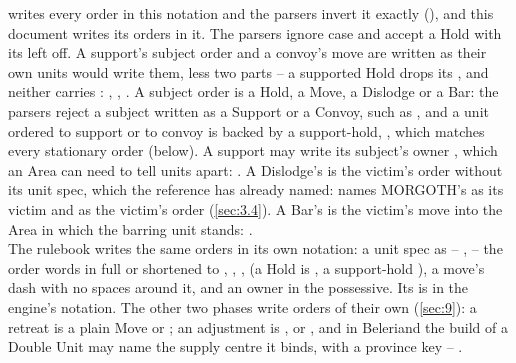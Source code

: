 \documentclass[12pt,a4paper]{article}
\begin{document}
 writes every order in this notation and the parsers invert it exactly (), and this document writes its orders in it.
The parsers ignore case and accept a Hold with its  left off.
A support's subject order and a convoy's move are written as their own units would write them, less two parts -- a supported Hold drops its , and neither carries : , , .
A subject order is a Hold, a Move, a Dislodge or a Bar: the parsers reject a subject written as a Support or a Convoy, such as , and a unit ordered to support or to convoy is backed by a support-hold, , which matches every stationary order (below).
A support may write its subject's owner , which an Area can need to tell units apart: .
A Dislodge's  is the victim's order without its unit spec, which the reference has already named:  names MORGOTH's  as its victim and  as the victim's order (\cref{sec:3.4}).
A Bar's  is the victim's move into the Area in which the barring unit stands: .\\
The rulebook writes the same orders in its own notation: a unit spec as  -- ,  -- the order words in full or shortened to , , ,  (a Hold is , a support-hold ), a move's dash with no spaces around it, and an owner in the possessive.
Its  is  in the engine's notation.
The other two phases write orders of their own (\cref{sec:9}): a retreat is a plain Move  or ; an adjustment is ,  or , and in Beleriand the build of a Double Unit may name the supply centre it binds,  with  a province key -- .
\end{document}
